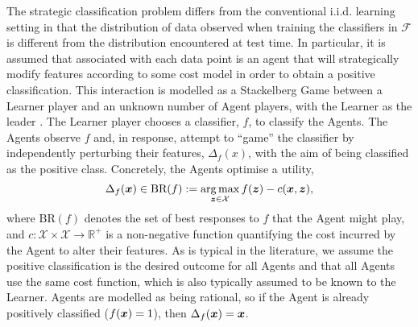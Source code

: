 The strategic classification problem \citep{hardt2016} differs from the conventional i.i.d. learning setting in that the distribution of data observed when training the classifiers in $\mathcal{F}$ is different from the distribution encountered at test time. In particular, it is assumed that associated with each data point is an agent that will strategically modify features according to some cost model in order to obtain a positive classification. This interaction is modelled as a Stackelberg Game between a Learner player and an unknown number of Agent players, with the Learner as the leader \citep{stackelberg1934}. The Learner player chooses a classifier, $f$, to classify the Agents. The Agents observe $f$ and, in response, attempt to ``game'' the classifier by independently perturbing their features, $\Delta_{f}(x)$, with the aim of being classified as the positive class. Concretely, the Agents optimise a utility,
\begin{equation}
    \Delta_{f}({\bm{x}}) \in \text{BR}(f) := \operatorname*{arg\,max}_{{\bm{z}} \in \mathcal{X}} f({\bm{z}}) - c({\bm{x}},{\bm{z}}),
    \label{eqn:strategic_response}
\end{equation}
where $\text{BR}(f)$ denotes the set of best responses to $f$ that the Agent might play, and $c: \mathcal{X} \times \mathcal{X} \rightarrow \mathbb{R}^{+}$ is a non-negative function quantifying the cost incurred by the Agent to alter their features. As is typical in the literature, we assume the positive classification is the desired outcome for all Agents and that all Agents use the same cost function, which is also typically assumed to be known to the Learner. Agents are modelled as being rational, so if the Agent is already positively classified ($f({\bm{x}})=1$), then $\Delta_{f}({\bm{x}}) = {\bm{x}}$.

